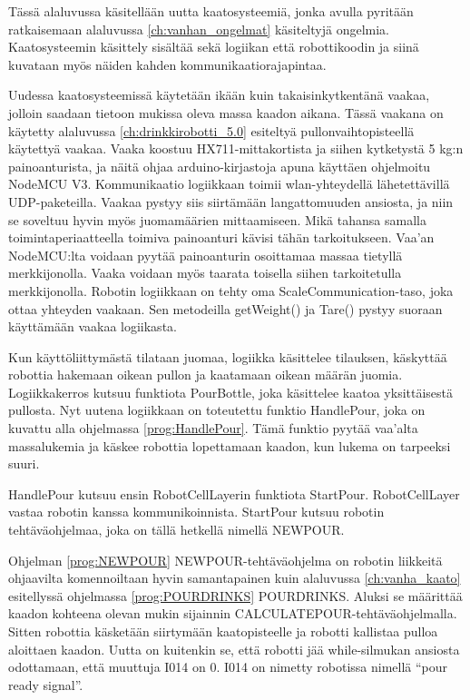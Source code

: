 Tässä alaluvussa käsitellään uutta kaatosysteemiä, jonka avulla pyritään ratkaisemaan alaluvussa \ref{ch:vanhan_ongelmat} käsiteltyjä ongelmia. Kaatosysteemin käsittely sisältää sekä logiikan että robottikoodin ja siinä kuvataan myös näiden kahden kommunikaatiorajapintaa.

Uudessa kaatosysteemissä käytetään ikään kuin takaisinkytkentänä vaakaa, jolloin saadaan tietoon mukissa oleva massa kaadon aikana. Tässä vaakana on käytetty alaluvussa \ref{ch:drinkkirobotti_5.0} esiteltyä pullonvaihtopisteellä käytettyä vaakaa. Vaaka koostuu HX711\hyp{}mittakortista ja siihen kytketystä 5 kg:n painoanturista, ja näitä ohjaa arduino\hyp{}kirjastoja apuna käyttäen ohjelmoitu NodeMCU V3. Kommunikaatio logiikkaan toimii wlan\hyp{}yhteydellä lähetettävillä UDP\hyp{}paketeilla. Vaakaa pystyy siis siirtämään langattomuuden ansiosta, ja niin se soveltuu hyvin myös juomamäärien mittaamiseen. Mikä tahansa samalla toimintaperiaatteella toimiva painoanturi kävisi tähän tarkoitukseen. Vaa'an NodeMCU:lta voidaan pyytää painoanturin osoittamaa massaa tietyllä merkkijonolla. Vaaka voidaan myös taarata toisella siihen tarkoitetulla merkkijonolla. Robotin logiikkaan on tehty oma ScaleCommunication-taso, joka ottaa yhteyden vaakaan. Sen metodeilla getWeight() ja Tare() pystyy suoraan käyttämään vaakaa logiikasta.

Kun käyttöliittymästä tilataan juomaa, logiikka käsittelee tilauksen, käskyttää robottia hakemaan oikean pullon ja kaatamaan oikean määrän juomia. Logiikkakerros kutsuu funktiota PourBottle, joka käsittelee kaatoa yksittäisestä pullosta. Nyt uutena logiikkaan on toteutettu funktio HandlePour, joka on kuvattu alla ohjelmassa \ref{prog:HandlePour}. Tämä funktio pyytää vaa'alta massalukemia ja käskee robottia lopettamaan kaadon, kun lukema on tarpeeksi suuri.

\newpage

\lstset{style=sharpc}


HandlePour kutsuu ensin RobotCellLayerin funktiota StartPour. RobotCellLayer vastaa robotin kanssa kommunikoinnista. StartPour kutsuu robotin tehtäväohjelmaa, joka on tällä hetkellä nimellä NEWPOUR.

\lstset{style=Yaskawatyyli}


Ohjelman \ref{prog:NEWPOUR} NEWPOUR\hyp{}tehtäväohjelma on robotin liikkeitä ohjaavilta komennoiltaan hyvin samantapainen kuin alaluvussa \ref{ch:vanha_kaato} esitellyssä ohjelmassa \ref{prog:POURDRINKS} POURDRINKS. Aluksi se määrittää kaadon kohteena olevan mukin sijainnin CALCULATEPOUR\hyp{}tehtäväohjelmalla. Sitten robottia käsketään siirtymään kaatopisteelle ja robotti kallistaa pulloa aloittaen kaadon. Uutta on kuitenkin se, että robotti jää while\hyp{}silmukan ansiosta odottamaan, että muuttuja I014 on 0. I014 on nimetty robotissa nimellä ``pour ready signal''.

